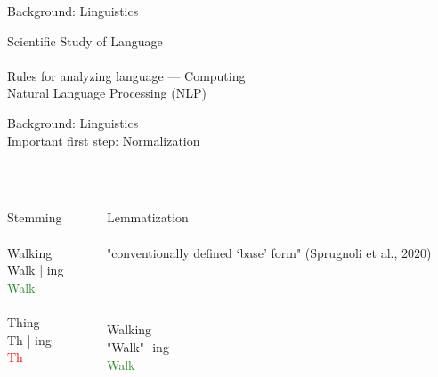 \documentclass[aspectratio=169,xcolor=dvipsnames]{beamer}
\begin{document}
\begin{frame}[plain]
  \titlepage
\end{frame}

\begin{frame}{Background: Linguistics}

    Scientific Study of Language\\
   
\ \\
    Rules for analyzing language --- Computing \\
    Natural Language Processing  (NLP)\\
    
\end{frame}

\begin{frame}[t]{Background: Linguistics}
    \ \\
    Important first step: Normalization\\

    \ \\
    \ \\

    
    \begin{columns}
        \begin{column}{0.5\textwidth}
        \centering
        \large
            Stemming \\ \ \\
           Walking \\
           Walk | ing \\
           \textcolor{ForestGreen}{Walk}
            \\ \ \\
            Thing \\
            Th | ing \\
            \textcolor{red}{Th}

        \end{column}
        \pause
        \begin{column}{0.5\textwidth}
        \centering
            Lemmatization \\
            \ \\
            \centering
            "conventionally defined ‘base’ form" (Sprugnoli et al., 2020) \\ \ \\
             \begin{columns}
            \begin{column}{0.5\textwidth}
            \ \\
            \centering
            \large
            Walking \\
            "Walk" -ing \\
           \textcolor{ForestGreen}{Walk} \\ \ \\
            \end{column}
            

\end{columns}
\end{column}
\end{columns}
\end{frame}
\end{document}
